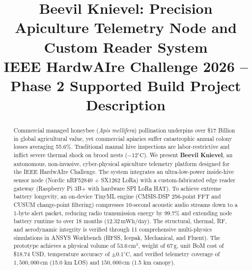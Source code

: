 \documentclass[10pt,conference,letterpaper]{IEEEtran}
\begin{document}
\title{Beevil Knievel: Precision Apiculture Telemetry Node and Custom Reader System\\
\large IEEE HardwAIre Challenge 2026 -- Phase 2 Supported Build Project Description}

\author{
}

\maketitle

\begin{abstract}
Commercial managed honeybee (\textit{Apis mellifera}) pollination underpins over \$17 Billion in global agricultural value, yet commercial apiaries suffer catastrophic annual colony losses averaging 55.6\%. Traditional manual hive inspections are labor-restrictive and inflict severe thermal shock on brood nests ($-\text{12}^\circ\text{C}$). We present \textbf{Beevil Knievel}, an autonomous, non-invasive, cyber-physical apiculture telemetry platform designed for the IEEE HardwAIre Challenge. The system integrates an ultra-low-power inside-hive sensor node (Nordic nRF52840 + SX1262 LoRa) with a custom-fabricated edge reader gateway (Raspberry Pi 3B+ with hardware SPI LoRa HAT). To achieve extreme battery longevity, an on-device TinyML engine (CMSIS-DSP 256-point FFT and CUSUM change-point filtering) compresses 10-second acoustic audio streams down to a 1-byte alert packet, reducing radio transmission energy by 99.7\% and extending node battery runtime to over 18 months ($12.32\,\text{mWh/day}$). The structural, thermal, RF, and aerodynamic integrity is verified through 11 comprehensive multi-physics simulations in ANSYS Workbench (HFSS, Icepak, Mechanical, and Fluent). The prototype achieves a physical volume of $53.6\,\text{cm}^3$, weight of $67\,\text{g}$, unit BoM cost of \$18.74 USD, temperature accuracy of $\pm\text{0.1}^\circ\text{C}$, and verified telemetry coverage of $1,500,000\,\text{cm}$ (15.0 km LOS) and $150,000\,\text{cm}$ (1.5 km canopy).
\end{abstract}
\end{document}
